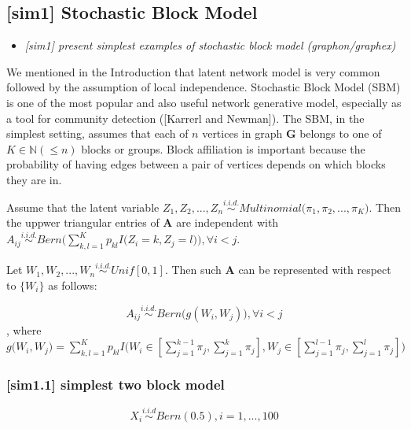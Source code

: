 \documentclass[12pt]{article}
\theoremstyle{definition}
\begin{document}
\subsection{[sim1] Stochastic Block Model}
\begin{itemize}
	\item {\it  [sim1] present simplest examples of stochastic block model (graphon/graphex) \/}
\end{itemize}

 We mentioned in the Introduction that latent network model is very common followed by the assumption of local independence. Stochastic Block Model (SBM) is one of the most popular and also useful network generative model, especially as a tool for community detection ([Karrerl and Newman]). The SBM, in the simplest setting, assumes that each of $n$ vertices in graph $\boldsymbol{G}$ belongs to one of $K \in \mathbb{N} (\leq n)$ blocks or groups. Block affiliation is important because the probability of having edges between a pair of vertices depends on which blocks they are in. 
 
 Assume that the latent variable $Z_{1}, Z_{2}, ... , Z_{n} \overset{i.i.d.}{\sim} Multinomial\big( \pi_{1}, \pi_{2}, ... , \pi_{K} \big)$. Then the uppwer triangular entries of $\mathbf{A}$ are independent with 
 $A_{ij} \overset{i.i.d.}{\sim} Bern\big( \sum\limits_{k,l=1}^{K} p_{kl} I\big( Z_{i} = k, Z_{j} = l  \big)    \big), \forall  i < j$.
 
 Let $W_{1}, W_{2}, ... , W_{n} \overset{i.i.d.}{\sim} Unif[0,1]$. Then such $\mathbf{A}$ can be represented with respect to $\{ W_{i} \}$ as follows:

\begin{equation} 
A_{ij} \overset{i.i.d.}{\sim} Bern \big( g(W_{i}, W_{j})  \big), \forall i < j
\end{equation}
 , where $g\big( W_{i}, W_{j} \big) = \sum\limits_{k,l=1}^{K} p_{kl} I \big( W_{i} \in [\sum\limits_{j=1}^{k-1} \pi_{j}, \sum\limits_{j=1}^{k} \pi_{j}   ] , W_{j} \in [\sum\limits_{j=1}^{l-1} \pi_{j}, \sum\limits_{j=1}^{l} \pi_{j}  ]  \big)$


\subsubsection{[sim1.1] simplest two block model}

\begin{equation}
X_{i} \overset{i.i.d}{\sim} Bern(0.5), i = 1,... , 100
\end{equation}
\end{document}
